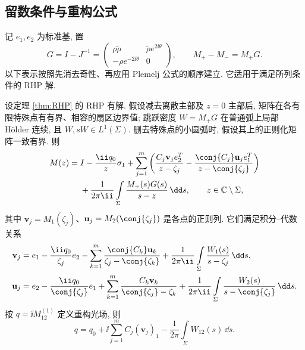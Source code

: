 \subsection{留数条件与重构公式}
记 $e_1,e_2$ 为标准基, 置
\begin{equation}\label{eq:Gdefinition}
G=I-J^{-1}=\begin{pmatrix}
\rho\widetilde\rho&\widetilde\rho e^{2\ii\theta}\\
-\rho e^{-2\ii\theta}&0
\end{pmatrix},\qquad M_+-M_-=M_+G.
\end{equation}
以下表示按照先消去奇性、再应用 Plemelj 公式的顺序建立\cite{ZhangFan2020,Fan2022}. 它适用于满足所列条件的 RHP 解.

\begin{proposition}[含反射的留数积分表示]\label{prop:cauchy-representation}
设定理 \ref{thm:RHP} 的 RHP 有解. 假设减去离散主部及 $z=0$ 主部后, 矩阵在各有限特殊点有有界、相容的扇区边界值; 跳跃密度 $W=M_+G$ 在普通弧上局部 Hölder 连续, 且 $W,sW\in L^1(\Sigma)$. 删去特殊点的小圆弧时, 假设其上的正则化矩阵一致有界. 则
\begin{equation}\label{eq:general-cauchy}
\begin{aligned}
M(z)={}&I-\dfrac{\ii q_0}{z}\sigma_1
+\sum\limits_{j=1}^{m}\left(
\dfrac{C_j\mathbf v_je_2^T}{z-\zeta_j}
-\dfrac{\conj{C_j}\mathbf u_je_1^T}{z-\conj{\zeta_j}}\right)\\
&+\dfrac{1}{2\pi\ii}\int\limits_\Sigma\dfrac{M_+(s)G(s)}{s-z}\,\dd s,
\qquad z\in\mathbb C\mathbin{\backslash}\Sigma,
\end{aligned}
\end{equation}
其中 $\mathbf v_j=M_1(\zeta_j)$、$\mathbf u_j=M_2(\conj{\zeta_j})$ 是各点的正则列. 它们满足积分--代数关系
\begin{align}
\mathbf v_j={}&e_1-\dfrac{\ii q_0}{\zeta_j}e_2
-\sum\limits_{k=1}^{m}\dfrac{\conj{C_k}\mathbf u_k}{\zeta_j-\conj{\zeta_k}}
+\dfrac{1}{2\pi\ii}\int\limits_\Sigma\dfrac{W_1(s)}{s-\zeta_j}\,\dd s,
\label{eq:general-finite1}\\
\mathbf u_j={}&e_2-\dfrac{\ii q_0}{\conj{\zeta_j}}e_1
+\sum\limits_{k=1}^{m}\dfrac{C_k\mathbf v_k}{\conj{\zeta_j}-\zeta_k}
+\dfrac{1}{2\pi\ii}\int\limits_\Sigma\dfrac{W_2(s)}{s-\conj{\zeta_j}}\,\dd s.
\label{eq:general-finite2}
\end{align}
按 $q=\ii M^{(1)}_{12}$ 定义重构光场, 则
\begin{equation}\label{eq:qgeneral}
q=q_0+\ii\sum\limits_{j=1}^{m}C_j(\mathbf v_j)_1
-\dfrac{1}{2\pi}\int\limits_\Sigma W_{12}(s)\,\dd s.
\end{equation}
\end{proposition}
